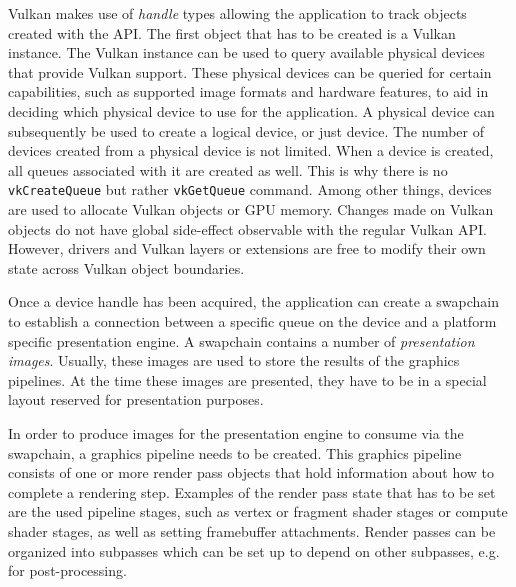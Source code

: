     Vulkan makes use of \textit{handle} types allowing the \gls{application} to track objects created with the API. The first object that has to be created is a Vulkan instance. The Vulkan instance can be used to query available physical \glspl{device} that provide Vulkan support. These physical \glspl{device} can be queried for certain capabilities, such as supported image formats and hardware features, to aid in deciding which physical device to use for the \gls{application}. A physical device can subsequently be used to create a logical device, or just device. The number of \glspl{device} created from a physical device is not limited. When a device is created, all queues associated with it are created as well. This is why there is no \lstinline{vkCreateQueue} but rather \lstinline{vkGetQueue} command. Among other things, \glspl{device} are used to allocate Vulkan objects or GPU memory. Changes made on Vulkan objects do not have global side-effect observable with the regular Vulkan API. However, \glspl{driver} and Vulkan layers or extensions are free to modify their own state across Vulkan object boundaries.



    Once a device handle has been acquired, the \gls{application} can create a swapchain to establish a connection between a specific queue on the device and a platform specific presentation engine. A swapchain contains a number of \textit{presentation images}. Usually, these images are used to store the results of the graphics pipelines. At the time these images are presented, they have to be in a special layout reserved for presentation purposes.

    In order to produce images for the presentation engine to consume via the swapchain, a graphics pipeline needs to be created. This graphics pipeline consists of one or more render pass objects that hold information about how to complete a rendering step. Examples of the render pass state that has to be set are the used pipeline stages, such as vertex or fragment shader stages or compute shader stages, as well as setting framebuffer attachments. Render passes can be organized into subpasses which can be set up to depend on other subpasses, e.g. for post-processing.

